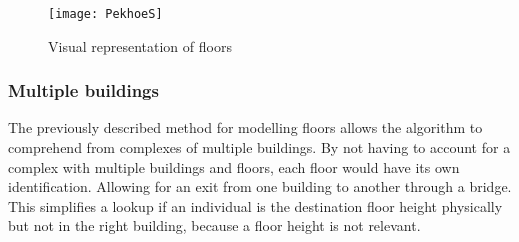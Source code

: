 \begin{figure}[ht!]
    \centering
    \texttt{[image: PekhoeS]}
    \caption{Visual representation of floors}
    \label{fig:PekhoeS}
  \end{figure}

\subsubsection{Multiple buildings}

The previously described method for modelling floors allows the algorithm to comprehend from complexes of multiple buildings. By not having to account for a complex with multiple buildings and floors, each floor would have its own identification. Allowing for an exit from one building to another through a bridge. This simplifies a lookup if an individual is the destination floor height physically but not in the right building, because a floor height is not relevant.
